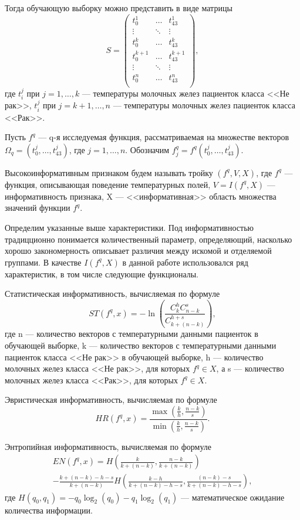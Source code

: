 Тогда обучающую выборку можно представить в виде матрицы
\[
S =
\begin{pmatrix}
t_{0}^{1} & \dots & t_{43}^{1} \\
\vdots & \ddots & \vdots \\
t_{0}^{k} & \dots & t_{43}^{k} \\
t_{0}^{k + 1} & \dots & t_{43}^{k + 1} \\
\vdots & \ddots & \vdots \\
t_{0}^{n} & \dots & t_{43}^{n} \\
\end{pmatrix}
,\] где \(t_{i}^{j}\) при \(j = 1, \dots, k\) --- температуры
молочных желез пациенток класса <<Не рак>>, \(t_{i}^{j}\) при \(j =
k + 1, \dots, n\) --- температуры молочных желез пациенток класса
<<Рак>>.

Пусть \(f^{q}\) --- q-я исследуемая функция, рассматриваемая на множестве векторов \(\Omega_{q} = {(t_{0}^{j}, \dots, t_{43}^{j})}\), где \(j = 1, \dots, n\). Обозначим \(f_{j}^{q} = f^{q}(t_{0}^{j}, \dots, t_{43}^{j})\).

Высокоинформативным признаком будем называть тройку \((f^{q}, V, X)\), где \(f^{q}\) --- функция, описывающая поведение температурных полей, \(V = I(f^{q}, X)\) --- информативность признака, X --- <<информативная>> область множества значений функции \(f^{q}\).

Определим указанные выше характеристики. Под информативностью
традицционно понимается количественный параметр, определяющий,
насколько хорошо закономерность описывает различия между искомой и
отделяемой группами. В качестве \(I(f^{q}, X)\) в данной работе
использовался ряд характеристик, в том числе следующие
функционалы.

Статистическая информативность, вычисляемая по формуле
\[ST(f^{q}, x) = -\ln(\frac{C_{k}^{h}C_{n - k}^{s}}{C_{k + (n - k)}^{h +
s}}),\] где n --- количество векторов с температурными данными
пациенток в обучающей выборке, k --- количество векторов с
температурными данными пациенток класса <<Не рак>> в обучающей
выборке, h --- количество молочных желез класса <<Не рак>>, для
которых \(f^{q} \in X\), а s --- количество молочных желез класса
<<Рак>>, для которых \(f^{q} \in X.\)

Эвристическая информативность, вычисляемая по формуле
\[HR(f^{q}, x) = \frac{\max(\frac{k}{h}, \frac{n - k}{s})}{\min(\frac{k}{h}, \frac{n - k}{s})}.\]


Энтропийная информативность, вычисляемая по формуле
\begin{align*}
EN(f^{q}, x) = H(\frac{k}{k + (n - k)}, \frac{n - k}{k + (n - k)})\\
 - \frac{k + (n - k) - h - s}{k + (n - k)}H(\frac{k - h}{k + (n - k) - h - s},
 \frac{(n - k) - s}{k + (n - k) - h - s}),
\end{align*}
где \(H(q_{0}, q_{1}) = -q_{0}\log_{2}(q_{0}) -q_{1}\log_{2}(q_{1})\) --- математическое ожидание количества информации.

